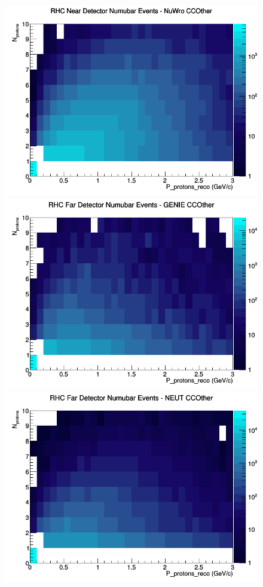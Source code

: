 \documentclass[12pt]{article}
\begin{document}
\begin{figure}[h]
\includegraphics[width=\linewidth]{eff_N_P/LAr/protons/CCOther_RHC_ND_numubar_N_P_NuWro.png}
\endminipage
\newline
{}
\includegraphics[width=\linewidth]{eff_N_P/LAr/protons/CCOther_RHC_FD_numubar_N_P_GENIE.png}
\endminipage
{}
\includegraphics[width=\linewidth]{eff_N_P/LAr/protons/CCOther_RHC_FD_numubar_N_P_NEUT.png}

\end{figure}
\end{document}
